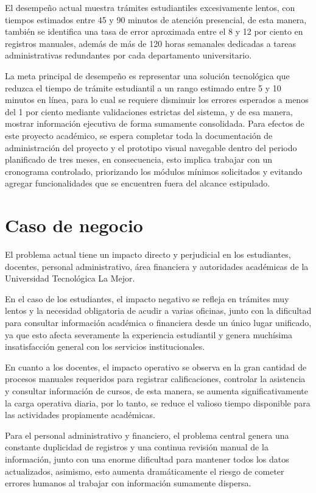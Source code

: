 \documentclass[11pt,spanish]{article}
\begin{document}
El desempeño actual muestra trámites estudiantiles excesivamente lentos, con tiempos estimados entre 45 y 90 minutos de atención presencial, de esta manera, también se identifica una tasa de error aproximada entre el 8 y 12 por ciento en registros manuales, además de más de 120 horas semanales dedicadas a tareas administrativas redundantes por cada departamento universitario.

La meta principal de desempeño es representar una solución tecnológica que reduzca el tiempo de trámite estudiantil a un rango estimado entre 5 y 10 minutos en línea, para lo cual se requiere disminuir los errores esperados a menos del 1 por ciento mediante validaciones estrictas del sistema, y de esa manera, mostrar información ejecutiva de forma sumamente consolidada. Para efectos de este proyecto académico, se espera completar toda la documentación de administración del proyecto y el prototipo visual navegable dentro del periodo planificado de tres meses, en consecuencia, esto implica trabajar con un cronograma controlado, priorizando los módulos mínimos solicitados y evitando agregar funcionalidades que se encuentren fuera del alcance estipulado.

\section{Caso de negocio}

El problema actual tiene un impacto directo y perjudicial en los estudiantes, docentes, personal administrativo, área financiera y autoridades académicas de la Universidad Tecnológica La Mejor.

En el caso de los estudiantes, el impacto negativo se refleja en trámites muy lentos y la necesidad obligatoria de acudir a varias oficinas, junto con la dificultad para consultar información académica o financiera desde un único lugar unificado, ya que esto afecta severamente la experiencia estudiantil y genera muchísima insatisfacción general con los servicios institucionales.

En cuanto a los docentes, el impacto operativo se observa en la gran cantidad de procesos manuales requeridos para registrar calificaciones, controlar la asistencia y consultar información de cursos, de esta manera, se aumenta significativamente la carga operativa diaria, por lo tanto, se reduce el valioso tiempo disponible para las actividades propiamente académicas.

Para el personal administrativo y financiero, el problema central genera una constante duplicidad de registros y una continua revisión manual de la información, junto con una enorme dificultad para mantener todos los datos actualizados, asimismo, esto aumenta dramáticamente el riesgo de cometer errores humanos al trabajar con información sumamente dispersa.
\end{document}
